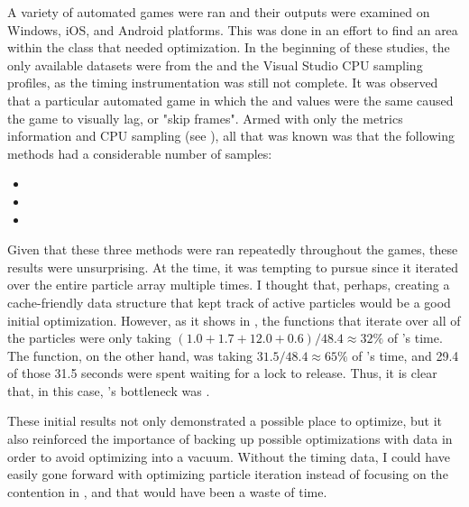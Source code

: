 A variety of automated games were ran and their outputs were examined on Windows, iOS, and Android platforms. This was done in an effort to find an area within the  class that needed optimization. In the beginning of these studies, the only available datasets were from the  and the Visual Studio CPU sampling profiles, as the timing instrumentation was still not complete. It was observed that a particular automated game in which the  and  values were the same\footnotemark $ $ caused the game to visually lag, or "skip frames". Armed with only the metrics information and CPU sampling (see ), all that was known was that the following  methods had a considerable number of samples:


\begin{itemize}[nolistsep,topsep=0pt]
	\item {}
	\item {}
	\item {}
\end{itemize}

Given that these three methods were ran repeatedly throughout the games, these results were unsurprising. At the time, it was tempting to pursue  since it iterated over the entire particle array multiple times. I thought that, perhaps, creating a cache-friendly data structure that kept track of active particles would be a good initial optimization. However, as it shows in , the functions that iterate over all of the particles were only taking $ (1.0 + 1.7 + 12.0 + 0.6)/48.4 \approx 32\% $ of 's time. The  function, on the other hand, was taking $ 31.5 / 48.4 \approx 65\% $ of 's time, and 29.4 of those 31.5 seconds were spent waiting for a lock to release. Thus, it is clear that, in this case, 's bottleneck was . 

These initial results not only demonstrated a possible place to optimize, but it also reinforced the importance of backing up possible optimizations with data in order to avoid optimizing into a vacuum. Without the timing data, I could have easily gone forward with optimizing particle iteration instead of focusing on the contention in , and that would have been a waste of time.



